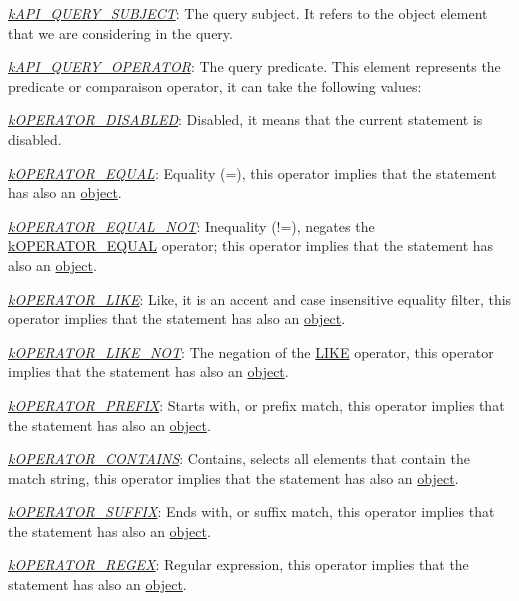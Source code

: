 {\itshape 
\begin{DoxyItemize}
\item {\itshape \hyperlink{}{k\-A\-P\-I\-\_\-\-Q\-U\-E\-R\-Y\-\_\-\-S\-U\-B\-J\-E\-C\-T}}\-: The query subject. It refers to the object element that we are considering in the query. 
\item {\itshape \hyperlink{}{k\-A\-P\-I\-\_\-\-Q\-U\-E\-R\-Y\-\_\-\-O\-P\-E\-R\-A\-T\-O\-R}}\-: The query predicate. This element represents the predicate or comparaison operator, it can take the following values\-: 
\begin{DoxyItemize}
\item {\itshape \hyperlink{}{k\-O\-P\-E\-R\-A\-T\-O\-R\-\_\-\-D\-I\-S\-A\-B\-L\-E\-D}}\-: Disabled, it means that the current statement is disabled. 
\item {\itshape \hyperlink{}{k\-O\-P\-E\-R\-A\-T\-O\-R\-\_\-\-E\-Q\-U\-A\-L}}\-: Equality (=), this operator implies that the statement has also an \hyperlink{}{object}. 
\item {\itshape \hyperlink{}{k\-O\-P\-E\-R\-A\-T\-O\-R\-\_\-\-E\-Q\-U\-A\-L\-\_\-\-N\-O\-T}}\-: Inequality (!=), negates the \hyperlink{}{k\-O\-P\-E\-R\-A\-T\-O\-R\-\_\-\-E\-Q\-U\-A\-L} operator; this operator implies that the statement has also an \hyperlink{}{object}. 
\item {\itshape \hyperlink{}{k\-O\-P\-E\-R\-A\-T\-O\-R\-\_\-\-L\-I\-K\-E}}\-: Like, it is an accent and case insensitive equality filter, this operator implies that the statement has also an \hyperlink{}{object}. 
\item {\itshape \hyperlink{}{k\-O\-P\-E\-R\-A\-T\-O\-R\-\_\-\-L\-I\-K\-E\-\_\-\-N\-O\-T}}\-: The negation of the \hyperlink{}{L\-I\-K\-E} operator, this operator implies that the statement has also an \hyperlink{}{object}. 
\item {\itshape \hyperlink{}{k\-O\-P\-E\-R\-A\-T\-O\-R\-\_\-\-P\-R\-E\-F\-I\-X}}\-: Starts with, or prefix match, this operator implies that the statement has also an \hyperlink{}{object}. 
\item {\itshape \hyperlink{}{k\-O\-P\-E\-R\-A\-T\-O\-R\-\_\-\-C\-O\-N\-T\-A\-I\-N\-S}}\-: Contains, selects all elements that contain the match string, this operator implies that the statement has also an \hyperlink{}{object}. 
\item {\itshape \hyperlink{}{k\-O\-P\-E\-R\-A\-T\-O\-R\-\_\-\-S\-U\-F\-F\-I\-X}}\-: Ends with, or suffix match, this operator implies that the statement has also an \hyperlink{}{object}. 
\item {\itshape \hyperlink{}{k\-O\-P\-E\-R\-A\-T\-O\-R\-\_\-\-R\-E\-G\-E\-X}}\-: Regular expression, this operator implies that the statement has also an \hyperlink{}{object}. 

\end{DoxyItemize}
\end{DoxyItemize}}
